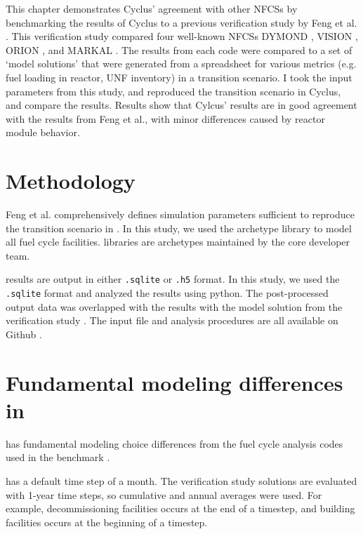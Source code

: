 This chapter demonstrates Cyclus' agreement with other
\glspl{NFCS} by benchmarking the results of Cyclus to
a previous verification study by Feng et al. \cite{feng_standardized_2016}.
This verification study compared four well-known \glspl{NFCS}
DYMOND \cite{yacout_modeling_2005},
VISION \cite{jacobson_verifiable_2010},
ORION \cite{gregg_analysis_2012}, and
MARKAL \cite{shay_epa_2006}. The results from each code were compared to a
set of `model solutions' that were generated from a spreadsheet
for various metrics (e.g. fuel loading in reactor, \gls{UNF} inventory)
in a transition scenario. I took the input parameters from this study,
and reproduced the transition scenario in Cyclus, and compare the results.
Results show that Cylcus' results are in good agreement with the results
from Feng et al., with minor differences caused by reactor module behavior.

\section{Methodology}

Feng et al. comprehensively defines simulation parameters
sufficient to reproduce the transition scenario in \Cyclus.
In this study, we used the \Cycamore \cite{huff_fundamental_2016}
archetype library to model
all fuel cycle facilities. \Cycamore libraries are
archetypes maintained by the core developer team.

\Cyclus results are output in either \texttt{.sqlite} or
\texttt{.h5} format. In this study, we used the
\texttt{.sqlite} format and analyzed the results
using python. The post-processed
output data was overlapped with the results with the
model solution from the verification study \cite{feng_standardized_2016}.
The input file and analysis procedures are all available on Github \cite{bae_arfc/transition-scenarios:_2018}.


\section{Fundamental modeling differences in \Cyclus}

\Cyclus has fundamental modeling choice differences from the fuel cycle analysis codes
used in the benchmark \cite{feng_standardized_2016}.

\Cyclus has a default time step of a month.
The verification study solutions are evaluated with 1-year time steps, so cumulative and annual averages
were used. For example, decommissioning
facilities occurs at the end of a timestep, and building facilities
occurs at the beginning of a timestep.

